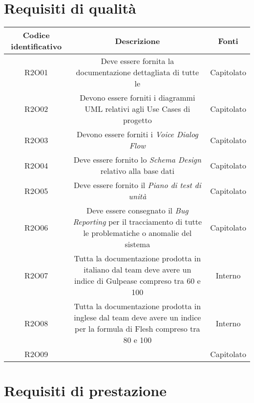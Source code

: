 \section{Requisiti di qualità}
\begin{tabularx}{\textwidth}{|C|C|C|}
	\hline
	\textbf{Codice identificativo} & \textbf{Descrizione} & \textbf{Fonti} \\
	\hline
	\endhead
	R2O01 & Deve essere fornita la documentazione dettagliata di tutte le  & Capitolato\\
	\hline
	R2O02 & Devono essere forniti i diagrammi UML relativi agli Use Cases di progetto  & Capitolato\\
	\hline
	R2O03 & Devono essere forniti i \textit{Voice Dialog Flow} & Capitolato\\
	\hline
	R2O04 & Deve essere fornito lo \textit{Schema Design} relativo alla base dati  & Capitolato\\
	\hline
	R2O05 & Deve essere fornito il \textit{Piano di test di unità} & Capitolato\\
	\hline
	R2O06 & Deve essere consegnato il \textit{Bug Reporting} per il tracciamento di
	tutte le problematiche o anomalie del sistema & Capitolato\\
	\hline
	R2O07 & Tutta la documentazione prodotta in italiano dal team deve avere
	un indice di Gulpease compreso tra 60 e 100 & Interno\\
	\hline
	R2O08 & Tutta la documentazione prodotta in inglese dal team deve avere
	un indice per la formula di Flesh compreso tra 80 e 100 & Interno\\
	\hline
	R2O09 &  & Capitolato\\
	\hline
\end{tabularx}

\section{Requisiti di prestazione}

